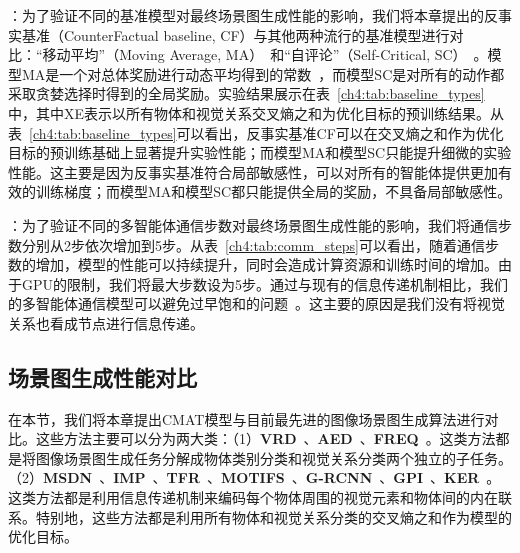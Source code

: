 \textbf{}：为了验证不同的基准模型对最终场景图生成性能的影响，我们将本章提出的反事实基准（CounterFactual baseline, CF）与其他两种流行的基准模型进行对比：“移动平均”（Moving Average, MA）~\cite{weaver2013optimal}和“自评论”（Self-Critical, SC）~\cite{rennie2017self}。模型MA是一个对总体奖励进行动态平均得到的常数~\cite{xu2015show, hu2017learning}，而模型SC是对所有的动作都采取贪婪选择时得到的全局奖励。实验结果展示在表~\ref{ch4:tab:baseline_types}中，其中XE表示以所有物体和视觉关系交叉熵之和为优化目标的预训练结果。从表~\ref{ch4:tab:baseline_types}可以看出，反事实基准CF可以在交叉熵之和作为优化目标的预训练基础上显著提升实验性能；而模型MA和模型SC只能提升细微的实验性能。这主要是因为反事实基准符合局部敏感性，可以对所有的智能体提供更加有效的训练梯度；而模型MA和模型SC都只能提供全局的奖励，不具备局部敏感性。

\textbf{}：为了验证不同的多智能体通信步数对最终场景图生成性能的影响，我们将通信步数分别从2步依次增加到5步。从表~\ref{ch4:tab:comm_steps}可以看出，随着通信步数的增加，模型的性能可以持续提升，同时会造成计算资源和训练时间的增加。由于GPU的限制，我们将最大步数设为5步。通过与现有的信息传递机制相比，我们的多智能体通信模型可以避免过早饱和的问题~\cite{dai2017detecting,xu2017scene}。这主要的原因是我们没有将视觉关系也看成节点进行信息传递。


\subsection{场景图生成性能对比}
在本节，我们将本章提出CMAT模型与目前最先进的图像场景图生成算法进行对比。这些方法主要可以分为两大类：（1）\textbf{VRD}~\cite{lu2016visual}、\textbf{AED}~\cite{newell2017pixels}、\textbf{FREQ}~\cite{zellers2018neural}。这类方法都是将图像场景图生成任务分解成物体类别分类和视觉关系分类两个独立的子任务。（2）\textbf{MSDN}~\cite{li2017scene}、\textbf{IMP}~\cite{xu2017scene}、\textbf{TFR}~\cite{jae2018tensorize}、\textbf{MOTIFS}~\cite{zellers2018neural}、\textbf{G-RCNN}~\cite{yang2018graph}、\textbf{GPI}~\cite{herzig2018mapping}、\textbf{KER}~\cite{chen2019knowledge}。这类方法都是利用信息传递机制来编码每个物体周围的视觉元素和物体间的内在联系。特别地，这些方法都是利用所有物体和视觉关系分类的交叉熵之和作为模型的优化目标。

